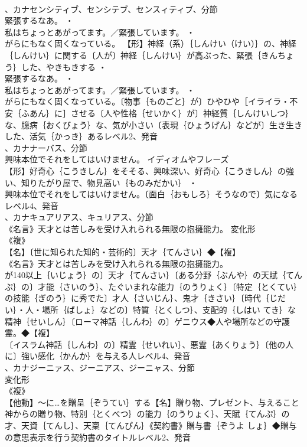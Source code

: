 \documentclass[8pt]{extreport}
\begin{document}
\begin{CJK}{UTF8}{min}
\\	、カナセンシティブ、センシテブ、センスィティブ、分節
\\	緊張するなあ。 ・
\\	私はちょっとあがってます。／緊張しています。 ・
\\	がらにもなく固くなっている。		【形】神経（系）｛しんけい（けい）｝の、神経｛しんけい｝に関する〔人が〕神経｛しんけい｝が高ぶった、緊張｛きんちょう｝した、やきもきする ・
\\	緊張するなあ。 ・
\\	私はちょっとあがってます。／緊張しています。 ・
\\	がらにもなく固くなっている。〔物事｛ものごと｝が〕ひやひや［イライラ・不安｛ふあん｝に］させる〔人や性格｛せいかく｝が〕神経質｛しんけいしつ｝な、臆病｛おくびょう｝な、気が小さい〔表現｛ひょうげん｝などが〕生き生きした、活気｛かっき｝あるレベル2、発音
\\	、カナナーバス、分節
\\	興味本位でそれをしてはいけません。	イディオムやフレーズ 
\\	【形】好奇心｛こうきしん｝をそそる、興味深い、好奇心｛こうきしん｝の強い、知りたがり屋で、物見高い｛ものみだかい｝ ・
\\	興味本位でそれをしてはいけません。〔面白｛おもしろ｝そうなので〕気になるレベル4、発音
\\	、カナキュアリアス、キュリアス、分節
\\	《名言》天才とは苦しみを受け入れられる無限の抱擁能力。	変化形 
\\	《複》
\\	【名】〔世に知られた知的・芸術的〕天才｛てんさい｝◆【複】
\\	《名言》天才とは苦しみを受け入れられる無限の抱擁能力。
\\	が140以上｛いじょう｝の〕天才｛てんさい｝〔ある分野｛ぶんや｝の天賦｛てんぷ｝の〕才能｛さいのう｝、たぐいまれな能力｛のうりょく｝〔特定｛とくてい｝の技能｛ぎのう｝に秀でた〕才人｛さいじん｝、鬼才｛きさい｝〔時代｛じだい｝・人・場所｛ばしょ｝などの〕特質｛とくしつ｝、支配的｛しはい てき｝な精神｛せいしん｝〔ローマ神話｛しんわ｝の〕ゲニウス◆人や場所などの守護霊。◆【複】
\\	〔イスラム神話｛しんわ｝の〕精霊｛せいれい｝、悪霊｛あくりょう｝〔他の人に〕強い感化｛かんか｝を与える人レベル4、発音
\\	、カナジーニァス、ジーニアス、ジーニャス、分節
\\	変化形 
\\	《複》
\\	【他動】～に…を贈呈｛ぞうてい｝する【名】贈り物、プレゼント、与えること神からの贈り物、特別｛とくべつ｝の能力｛のうりょく｝、天賦｛てんぷ｝の才、天資｛てんし｝、天稟｛てんぴん｝《契約書》贈与書｛ぞうよ しょ｝◆贈与の意思表示を行う契約書のタイトルレベル2、発音

\end{CJK}
\end{document}
